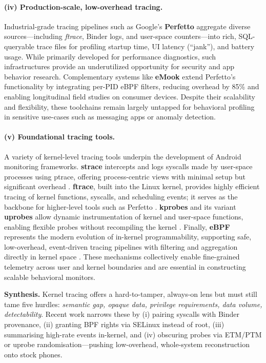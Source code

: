 \documentclass[a4paper,12pt]{report}
\begin{document}
\paragraph{(iv) Production-scale, low-overhead tracing.}
Industrial-grade tracing pipelines such as Google’s \textbf{Perfetto} aggregate diverse sources—including \textit{ftrace}, Binder logs, and user-space counters—into rich, SQL-queryable trace files for profiling startup time, UI latency (“jank”), and battery usage. While primarily developed for performance diagnostics, such infrastructures provide an underutilized opportunity for security and app behavior research. Complementary systems like \textbf{eMook} extend Perfetto’s functionality by integrating per-PID eBPF filters, reducing overhead by 85\% and enabling longitudinal field studies on consumer devices. Despite their scalability and flexibility, these toolchains remain largely untapped for behavioral profiling in sensitive use-cases such as messaging apps or anomaly detection.

\paragraph{(v) Foundational tracing tools.}
A variety of kernel-level tracing tools underpin the development of Android monitoring frameworks. \textbf{strace} intercepts and logs syscalls made by user-space processes using ptrace, offering process-centric views with minimal setup but significant overhead \cite{strace2023}. \textbf{ftrace}, built into the Linux kernel, provides highly efficient tracing of kernel functions, syscalls, and scheduling events; it serves as the backbone for higher-level tools such as Perfetto \cite{ftrace2023}. \textbf{kprobes} and its variant \textbf{uprobes} allow dynamic instrumentation of kernel and user-space functions, enabling flexible probes without recompiling the kernel \cite{kprobes2023}. Finally, \textbf{eBPF} represents the modern evolution of in-kernel programmability, supporting safe, low-overhead, event-driven tracing pipelines with filtering and aggregation directly in kernel space \cite{ebpf2023}. These mechanisms collectively enable fine-grained telemetry across user and kernel boundaries and are essential in constructing scalable behavioral monitors.

\medskip
\noindent\textbf{Synthesis.}
Kernel tracing offers a hard-to-tamper, always-on lens but must still tame five hurdles: \emph{semantic gap, opaque data, privilege requirements, data volume, detectability}.  Recent work narrows these by (i) pairing syscalls with Binder provenance, (ii) granting BPF rights via SELinux instead of root, (iii) summarising high-rate events in-kernel, and (iv) obscuring probes via ETM/PTM or uprobe randomisation—pushing low-overhead, whole-system reconstruction onto stock phones.
\end{document}
